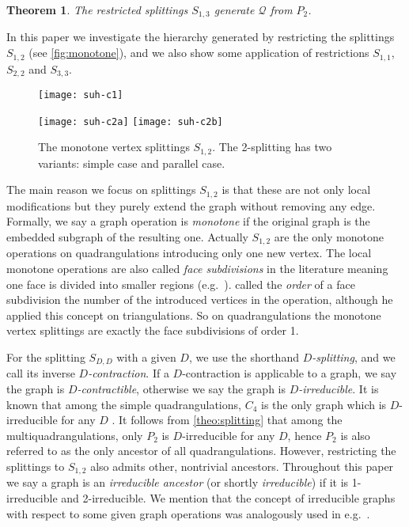 \documentclass[]{article}
\newtheorem{theo}{Theorem}\newtheorem{prop}{Proposition}\newtheorem*{prop*}{Proposition}\newtheorem{coro}{Corollary}\newtheorem{lemm}{Lemma}\theoremstyle{definition}
\begin{document}
\begin{theo}
\label{theo:splitting}
The restricted splittings $S_{1,3}$ generate $\mathscr{Q}$ from $P_2$. \end{theo}

In this paper we investigate the hierarchy generated by restricting the splittings $S_{1,2}$ (see \autoref{fig:monotone}), and we also show some application of restrictions $S_{1,1}$, $S_{2,2}$ and $S_{3,3}$.
\begin{figure}\centering
    \texttt{[image: suh-c1]}

    \texttt{[image: suh-c2a]}
    \qquad
    \texttt{[image: suh-c2b]}
\caption{The monotone vertex splittings $S_{1,2}$. The 2-splitting has two variants: simple case and parallel case.}
  \label{fig:monotone}
\end{figure}
The main reason we focus on splittings $S_{1,2}$ is that these are not only local modifications but they purely extend the graph without removing any edge.
Formally, we say a graph operation is \emph{monotone} if the original graph is the embedded subgraph of the resulting one.
Actually $S_{1,2}$ are the only monotone operations on quadrangulations introducing only one new vertex.
The local monotone operations are also called \emph{face subdivisions} in the literature meaning one face is divided into smaller regions (e.g.\  \cite{Tutte1963,Mohar2010}).
\citet{Tutte1963} called the \emph{order} of a face subdivision the number of the introduced vertices in the operation, although he applied this concept on triangulations.
So on quadrangulations the monotone vertex splittings are exactly the face subdivisions of order 1.

For the splitting $S_{D,D}$ with a given $D$, we use the shorthand \emph{$D$-splitting}, and we call its inverse \emph{$D$-contraction}.
If a $D$-contraction is applicable to a graph, we say the graph is \emph{$D$-contractible}, otherwise we say the graph is \emph{$D$-irreducible}.
It is known that among the simple quadrangulations, $C_4$ is the only graph which is $D$-irreducible for any $D$ \cite{Batagelj1989, Negami1993}.
It follows from \autoref{theo:splitting}
 that among the multiquadrangulations, only $P_2$ is $D$-irreducible for any $D$, hence $P_2$ is also referred to as the only ancestor of all quadrangulations.
However, restricting the splittings to $S_{1,2}$ also admits other, nontrivial ancestors.
Throughout this paper we say a graph is an \emph{irreducible ancestor} (or shortly \emph{irreducible}) if it is 1-irreducible and 2-irreducible.
We mention that the concept of irreducible graphs with respect to some given graph operations was analogously used in e.g.\  \cite{Negami1993, Nakamoto1996b}.
\end{document}
